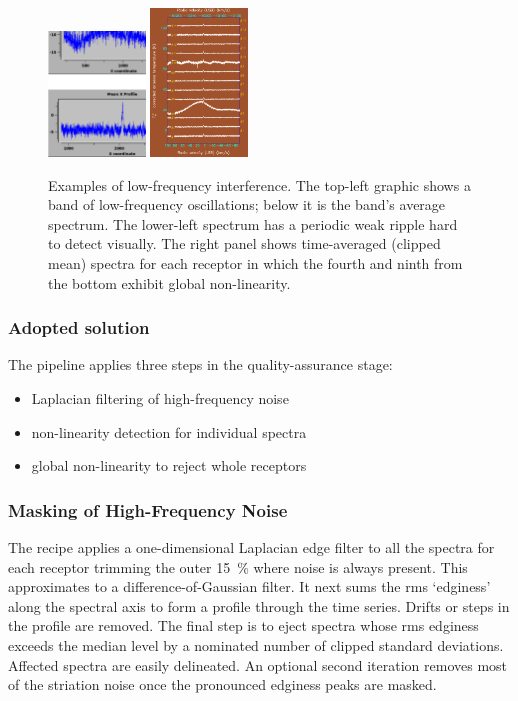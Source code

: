 \documentclass[final,authoryear,5p,times,twocolumn]{elsarticle}
\begin{document}
\begin{figure}[!ht]
\includegraphics[width=0.23\textwidth]{P61_f2a}
\includegraphics[width=0.23\textwidth]{P61_f2b}
\caption{Examples of low-frequency interference.  The top-left graphic
 shows a band of low-frequency oscillations; below it is the band's
 average spectrum.  The lower-left spectrum has a periodic weak
 ripple hard to detect visually.  The right panel shows time-averaged
(clipped mean) spectra for each receptor in which the fourth and
  ninth from the bottom exhibit global non-linearity.}
\label{fig:badbase:interference}
\end{figure}

\subsubsection{Adopted solution}

The pipeline applies three steps in the quality-assurance stage:
\begin{itemize}
\item Laplacian filtering of high-frequency noise
\item non-linearity detection for individual spectra
\item global non-linearity to reject whole receptors
\end{itemize}

\subsubsection{Masking of High-Frequency Noise}

The recipe applies a one-dimensional Laplacian edge filter to all the
spectra for each receptor trimming the outer 15~\% where noise is
always present.  This approximates to a difference-of-Gaussian
filter. It next sums the rms `edginess' along the spectral axis to
form a profile through the time series.  Drifts or steps in the
profile are removed.  The final step is to eject spectra whose rms
edginess exceeds the median level by a nominated number of clipped
standard deviations.  Affected spectra are easily delineated.  An
optional second iteration removes most of the striation noise once the
pronounced edginess peaks are masked.
\end{document}
